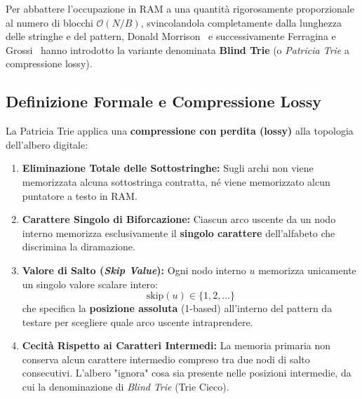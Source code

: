 Per abbattere l'occupazione in RAM a una quantit\`a rigorosamente proporzionale al numero di blocchi $\mathcal{O}(N/B)$, svincolandola completamente dalla lunghezza delle stringhe e del pattern, Donald Morrison~\cite{morrison1968} e successivamente Ferragina e Grossi~\cite{ferragina1999} hanno introdotto la variante denominata \textbf{Blind Trie} (o \textit{Patricia Trie} a compressione lossy).

\FloatBarrier
\subsection{Definizione Formale e Compressione Lossy}
\label{subsec:definizione-blind-trie}

La Patricia Trie applica una \textbf{compressione con perdita (lossy)} alla topologia dell'albero digitale:
\begin{enumerate}
  \item \textbf{Eliminazione Totale delle Sottostringhe:} Sugli archi non viene memorizzata alcuna sottostringa contratta, n\'e viene memorizzato alcun puntatore a testo in RAM.
  \item \textbf{Carattere Singolo di Biforcazione:} Ciascun arco uscente da un nodo interno memorizza esclusivamente il \textbf{singolo carattere} dell'alfabeto che discrimina la diramazione.
  \item \textbf{Valore di Salto (\textit{Skip Value}):} Ogni nodo interno $u$ memorizza unicamente un singolo valore scalare intero:
  \begin{equation}
    \text{skip}(u) \in \{1, 2, \dots\}
  \end{equation}
  che specifica la \textbf{posizione assoluta} (1-based) all'interno del pattern da testare per scegliere quale arco uscente intraprendere.
  \item \textbf{Cecit\`a Rispetto ai Caratteri Intermedi:} La memoria primaria non conserva alcun carattere intermedio compreso tra due nodi di salto consecutivi. L'albero "ignora" cosa sia presente nelle posizioni intermedie, da cui la denominazione di \textit{Blind Trie} (Trie Cieco).
\end{enumerate}

